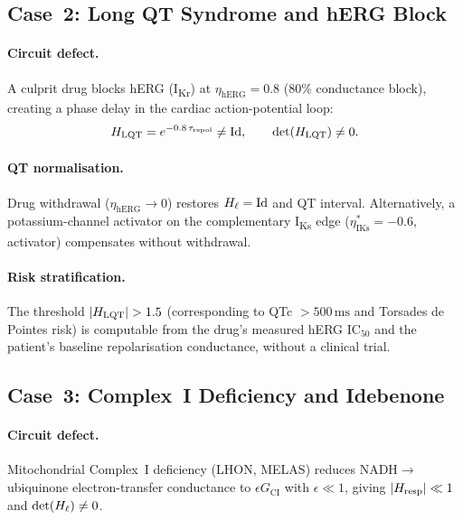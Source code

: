 \subsection{Case~2: Long QT Syndrome and hERG Block}
\label{subsec:ch09-lqt}

\paragraph{Circuit defect.}
A culprit drug blocks hERG (I\textsubscript{Kr}) at $\eta_{\mathrm{hERG}} =
0.8$ (80\% conductance block), creating a phase delay in the cardiac
action-potential loop:
\begin{equation}
  H_{\mathrm{LQT}} = e^{-0.8\,\tau_{\mathrm{repol}}} \neq \mathrm{Id},
  \qquad \det(H_{\mathrm{LQT}}) \neq 0.
  \label{eq:ch09-lqt-holonomy}
\end{equation}

\paragraph{QT normalisation.}
Drug withdrawal ($\eta_{\mathrm{hERG}} \to 0$) restores $H_\ell = \mathrm{Id}$
and QT interval.  Alternatively, a potassium-channel activator on the
complementary I\textsubscript{Ks} edge ($\eta^*_{\mathrm{IKs}} = -0.6$,
activator) compensates without withdrawal.

\paragraph{Risk stratification.}
The threshold $|H_{\mathrm{LQT}}| > 1.5$ (corresponding to QTc $>
500\,\mathrm{ms}$ and Torsades de Pointes risk) is computable from the drug's
measured hERG IC$_{50}$ and the patient's baseline repolarisation conductance,
without a clinical trial.

\subsection{Case~3: Complex~I Deficiency and Idebenone}
\label{subsec:ch09-complex1}

\paragraph{Circuit defect.}
Mitochondrial Complex~I deficiency (LHON, MELAS) reduces NADH$\to$ubiquinone
electron-transfer conductance to $\epsilon G_{\mathrm{CI}}$ with $\epsilon \ll
1$, giving $|H_{\mathrm{resp}}| \ll 1$ and $\det(H_\ell) \neq 0$.

